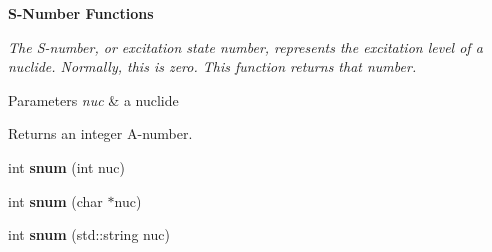 \begin{Indent}{\bf S-\/\-Number Functions}\par
{\em The S-\/number, or excitation state number, represents the excitation level of a nuclide. Normally, this is zero. This function returns that number. 
\begin{DoxyParams}{Parameters}
{\em nuc} & a nuclide \\
\hline
\end{DoxyParams}
\begin{DoxyReturn}{Returns}
an integer A-\/number. 
\end{DoxyReturn}
}\begin{DoxyCompactItemize}
\item 
\hypertarget{namespacepyne_1_1nucname_ad48fe72b30c8cdcc16156f4a4991af6b}{int {\bfseries snum} (int nuc)}\label{namespacepyne_1_1nucname_ad48fe72b30c8cdcc16156f4a4991af6b}

\item 
\hypertarget{namespacepyne_1_1nucname_a870b2829a3740e431f2724afba7061c3}{int {\bfseries snum} (char $\ast$nuc)}\label{namespacepyne_1_1nucname_a870b2829a3740e431f2724afba7061c3}

\item 
\hypertarget{namespacepyne_1_1nucname_a561dc9f333b1f890793caa4d7f6eb46b}{int {\bfseries snum} (std\-::string nuc)}\label{namespacepyne_1_1nucname_a561dc9f333b1f890793caa4d7f6eb46b}

\end{DoxyCompactItemize}
\end{Indent}

